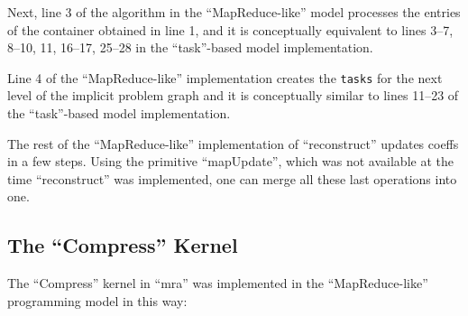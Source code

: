 \documentclass{article}
\begin{document}
Next, line 3 of the algorithm in the ``MapReduce-like'' model processes the
entries of the container obtained in line 1, and it is
conceptually equivalent to lines 3--7, 8--10, 11, 16--17, 25--28 in the
``task''-based model implementation.

Line 4 of the ``MapReduce-like'' implementation creates the {\tt tasks} for the
next level of the implicit problem graph and it is conceptually similar to
lines 11--23 of the ``task''-based model implementation.

The rest of the ``MapReduce-like'' implementation of ``reconstruct'' updates coeffs
in a few steps. Using the primitive ``mapUpdate'', which was not available 
at the time ``reconstruct'' was implemented, one can merge all these last
operations into one.

%
%
%
%
%

\subsection{The ``Compress'' Kernel}
\label{subsec:Compress}

The ``Compress'' kernel in ``mra'' was implemented in the ``MapReduce-like''
programming model in this way:
\end{document}
